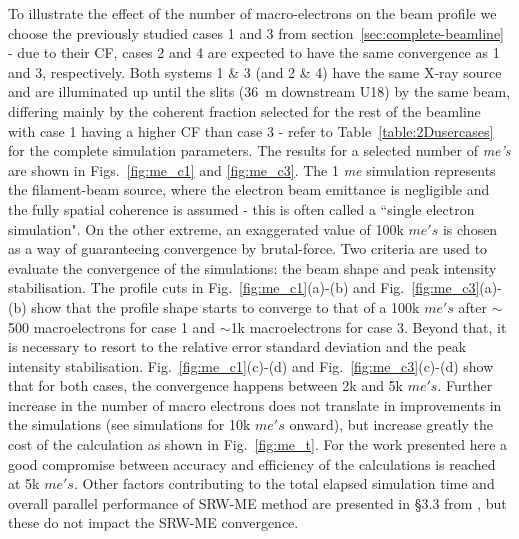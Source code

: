 \documentclass{iucr}              %
\begin{document}
To illustrate the effect of the number of macro-electrons on the beam profile we choose the previously studied cases 1 and 3 from section~\ref{sec:complete-beamline} - due to their CF, cases 2 and 4 are expected to have the same convergence as 1 and 3, respectively. Both systems 1 \& 3 (and 2 \& 4) have the same X-ray source and are illuminated up until the slits (36~m downstream U18) by the same beam, differing mainly by the coherent fraction selected for the rest of the beamline with case 1 having a higher CF than case 3 - refer to Table~\ref{table:2Dusercases} for the complete simulation parameters. The results for a selected number of \textit{me's} are shown in Figs.~\ref{fig:me_c1} and \ref{fig:me_c3}. The 1 \textit{me} simulation represents the filament-beam source, where the electron beam emittance is negligible and the fully spatial coherence is assumed - this is often called a ``single electron simulation". On the other extreme, an exaggerated value of 100k $me's$ is chosen as a way of guaranteeing convergence by brutal-force. Two criteria are used to evaluate the convergence of the simulations: the beam shape and peak intensity stabilisation. The profile cuts in  Fig.~\ref{fig:me_c1}(a)-(b) and Fig.~\ref{fig:me_c3}(a)-(b) show that the profile shape starts to converge to that of a 100k $me's$ after $\sim$500 macroelectrons for case 1 and $\sim$1k macroelectrons for case 3. Beyond that, it is necessary to resort to the relative error standard deviation and the peak intensity stabilisation. Fig.~\ref{fig:me_c1}(c)-(d) and Fig.~\ref{fig:me_c3}(c)-(d) show that for both cases, the convergence happens between 2k and 5k $me's$. Further increase in the number of macro electrons does not translate in improvements in the simulations (see simulations for 10k $me's$ onward), but increase greatly the cost of the calculation as shown in Fig.~\ref{fig:me_t}. For the work presented here a good compromise between accuracy and efficiency of the calculations is reached at 5k $me's$. Other factors contributing to the total elapsed simulation time and overall parallel performance of SRW-ME method are presented in \S3.3 from \cite{codeSRW_MEscan}, but these do not impact the SRW-ME convergence.
\end{document}
